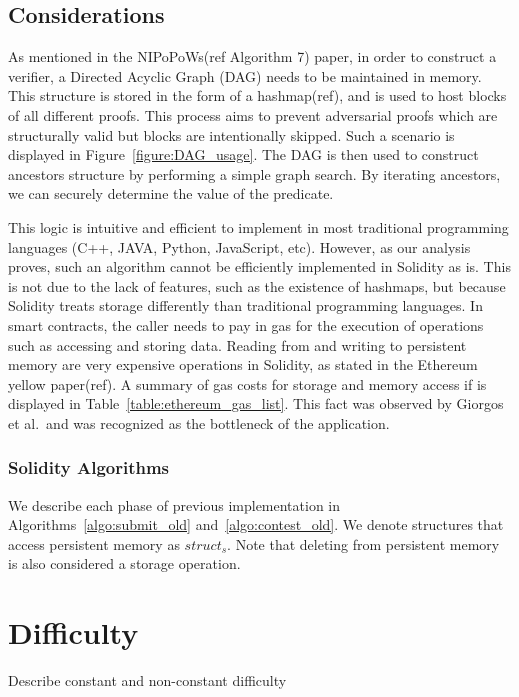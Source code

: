 \subsection{Considerations}

As mentioned in the NIPoPoWs(ref Algorithm 7) paper, in order to construct a
verifier, a Directed Acyclic Graph (DAG) needs to be maintained in memory. This
structure is stored in the form of a hashmap(ref), and is used to host blocks
of all different proofs. This process aims to prevent adversarial proofs which
are structurally valid but blocks are intentionally skipped. Such a scenario is
displayed in Figure~\ref{figure:DAG_usage}. The DAG is then used to construct
ancestors structure by performing a simple graph search. By iterating
ancestors, we can securely determine the value of the predicate.



This logic is intuitive and efficient to implement in most traditional
programming languages (C++, JAVA, Python, JavaScript, etc). However, as our
analysis proves, such an algorithm cannot be efficiently implemented in
Solidity as is. This is not due to the lack of features, such as the existence
of hashmaps, but because Solidity treats storage differently than traditional
programming languages. In smart contracts, the caller needs to pay in gas for
the execution of operations such as accessing and storing data. Reading from
and writing to persistent memory are very expensive operations in Solidity, as
stated in the Ethereum yellow paper(ref). A summary of gas costs for storage
and memory access if is displayed in Table~\ref{table:ethereum_gas_list}. This
fact was observed by Giorgos et al.\ and was recognized as the bottleneck of
the application.



\subsubsection{Solidity Algorithms}

We describe each phase of previous implementation in
Algorithms~\ref{algo:submit_old} and~\ref{algo:contest_old}. We denote
structures that access persistent memory as $struct_{s}$. Note that deleting
from persistent memory is also considered a storage operation.




\section{Difficulty}

Describe constant and non-constant difficulty
